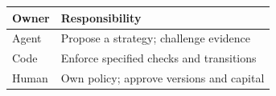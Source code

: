 \begin{tabular}{@{}P{4.0cm}P{8.5cm}@{}}
\toprule
\textbf{Owner} & \textbf{Responsibility} \\
\midrule
Agent & Propose a strategy; challenge evidence \\
Code & Enforce specified checks and transitions \\
Human & Own policy; approve versions and capital \\
\bottomrule
\end{tabular}
